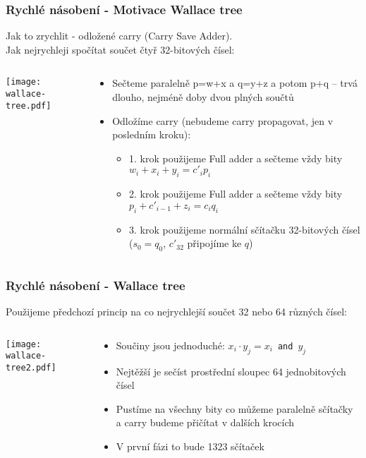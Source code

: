 \documentclass{beamer}
\begin{document}
\begin{frame}
\frametitle{Rychlé násobení - Motivace Wallace tree}

Jak to zrychlit - odložené carry (Carry Save Adder).\\
Jak nejrychleji spočítat součet čtyř 32-bitových čísel:\\
\begin{columns}
\begin{column}{0.35\textwidth}
\texttt{[image: wallace-tree.pdf]}
\end{column}
\hfill
\begin{column}{0.65\textwidth}
\begin{itemize}
\item Sečteme paralelně p=w+x a q=y+z a potom p+q -- trvá dlouho, nejméně doby dvou plných součtů
\item Odložíme carry (nebudeme carry propagovat, jen v posledním kroku):
\begin{itemize}
\item 1. krok použijeme Full adder a sečteme vždy bity $w_i+x_i+y_i = c'_ip_i$
\item 2. krok použijeme Full adder a sečteme vždy bity $p_i+c'_{i-1}+z_i = c_iq_i$
\item 3. krok použijeme normální sčítačku 32-bitových čísel ($s_0=q_0$, $c'_32$ připojíme ke $q$)
\end{itemize}
\end{itemize}
\end{column}
\end{columns}
\end{frame}

\begin{frame}
\frametitle{Rychlé násobení - Wallace tree}

Použijeme předchozí princip na co nejrychlejší součet 32 nebo 64 různých čísel:
\begin{columns}
\begin{column}{0.6\textwidth}
\texttt{[image: wallace-tree2.pdf]}
\end{column}
\hfill
\begin{column}{0.4\textwidth}
\begin{itemize}
\item Součiny jsou jednoduché: $x_i \cdot y_j=x_i$~\texttt{and}~$y_j$
\item Nejtěžší je sečíst prostřední sloupec 64 jednobitových čísel
\item Pustíme na všechny bity co můžeme paralelně sčítačky a carry budeme přičítat v dalších krocích
\item V první fázi to bude 1323 sčítaček
\end{itemize}
\end{column}
\end{columns}

\end{frame}
\end{document}
